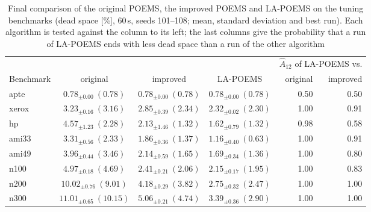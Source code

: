 \begin{table}
\centering
\footnotesize
\setlength{\tabcolsep}{4pt}
\begin{tabular}{@{}lcccrr@{}}
\toprule
 &  &  &  & \multicolumn{2}{c}{$\hat{A}_{12}$ of LA-POEMS vs.} \\
Benchmark & original & improved & LA-POEMS & original & improved \\
\midrule
apte & $0.78_{\pm 0.00}\ (0.78)$ & $0.78_{\pm 0.00}\ (0.78)$ & $0.78_{\pm 0.00}\ (0.78)$ & 0.50 & 0.50 \\
xerox & $3.23_{\pm 0.16}\ (3.16)$ & $\mathbf{2.85_{\pm 0.39}\ (2.34)}$ & $\mathbf{2.32_{\pm 0.02}\ (2.30)}$ & 1.00 & 0.91 \\
hp & $4.57_{\pm 1.23}\ (2.28)$ & $\mathbf{2.13_{\pm 1.46}\ (1.32)}$ & $1.62_{\pm 0.79}\ (1.32)$ & 0.98 & 0.58 \\
ami33 & $3.31_{\pm 0.56}\ (2.33)$ & $\mathbf{1.86_{\pm 0.36}\ (1.37)}$ & $\mathbf{1.16_{\pm 0.40}\ (0.63)}$ & 1.00 & 0.91 \\
ami49 & $3.96_{\pm 0.44}\ (3.46)$ & $\mathbf{2.14_{\pm 0.59}\ (1.65)}$ & $1.69_{\pm 0.34}\ (1.36)$ & 1.00 & 0.80 \\
n100 & $4.97_{\pm 0.18}\ (4.69)$ & $\mathbf{2.41_{\pm 0.21}\ (2.06)}$ & $\mathbf{2.15_{\pm 0.17}\ (1.95)}$ & 1.00 & 0.83 \\
n200 & $10.02_{\pm 0.76}\ (9.01)$ & $\mathbf{4.18_{\pm 0.29}\ (3.82)}$ & $\mathbf{2.75_{\pm 0.32}\ (2.47)}$ & 1.00 & 1.00 \\
n300 & $11.01_{\pm 0.65}\ (10.15)$ & $\mathbf{5.06_{\pm 0.21}\ (4.74)}$ & $\mathbf{3.39_{\pm 0.36}\ (2.90)}$ & 1.00 & 1.00 \\
\bottomrule
\end{tabular}
\caption{Final comparison of the original POEMS, the improved POEMS and LA-POEMS on the tuning benchmarks (dead space [\%], 60\,s, seeds 101--108; mean, standard deviation and best run). Each algorithm is tested against the column to its left; the last columns give the probability that a run of LA-POEMS ends with less dead space than a run of the other algorithm}
\label{tab:final}
\end{table}
